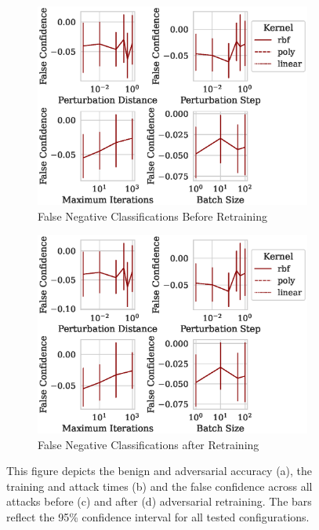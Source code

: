 \documentclass[fonts]{icst}
\begin{document}
\begin{figure}
\begin{subfigure}[b]{0.45\textwidth}
         \label{fig:retrain_time}
     \end{subfigure}
     \hfill
     \begin{subfigure}[b]{0.45\textwidth}
         \centering
         \includegraphics[width=\textwidth]{./generated/confidence_vs_attack_parameters.eps}
         \caption{False Negative Classifications Before Retraining}
        \label{fig:before_retrain}
     \end{subfigure}
     \hfill
     \begin{subfigure}[b]{0.45\textwidth}
         \centering
         \includegraphics[width=\textwidth]{./generated/retrain_confidence_vs_attack_parameters.eps}
         \caption{False Negative Classifications after Retraining}
        \label{fig:after_retrain}
     \end{subfigure}
     \hfill
     \label{fig:retratin}
     \caption{This figure depicts the benign and adversarial accuracy (a), the training and attack times (b) and the false confidence across all attacks before (c) and after (d) adversarial retraining.  The bars reflect the 95\% confidence interval for all tested configurations.}
\end{figure}
\end{document}
